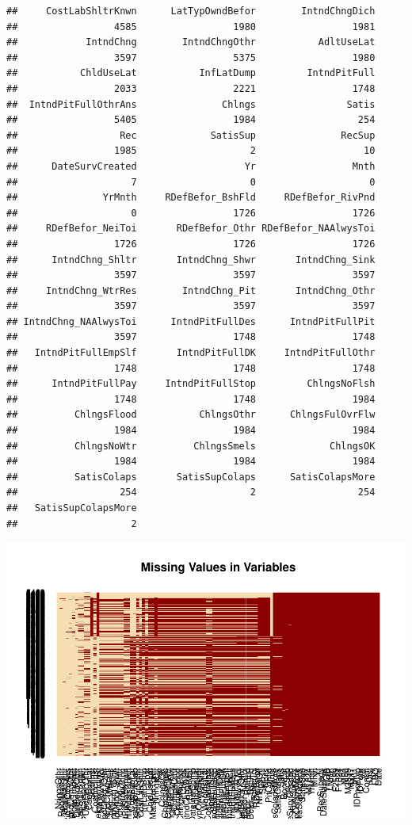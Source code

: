 \documentclass[11pt,]{article}
\begin{document}
\begin{verbatim}
##     CostLabShltrKnwn      LatTypOwndBefor        IntndChngDich 
##                 4585                 1980                 1981 
##            IntndChng        IntndChngOthr           AdltUseLat 
##                 3597                 5375                 1980 
##           ChldUseLat           InfLatDump         IntndPitFull 
##                 2033                 2221                 1748 
##  IntndPitFullOthrAns               Chlngs                Satis 
##                 5405                 1984                  254 
##                  Rec             SatisSup               RecSup 
##                 1985                    2                   10 
##      DateSurvCreated                   Yr                 Mnth 
##                    7                    0                    0 
##               YrMnth     RDefBefor_BshFld     RDefBefor_RivPnd 
##                    0                 1726                 1726 
##     RDefBefor_NeiToi       RDefBefor_Othr RDefBefor_NAAlwysToi 
##                 1726                 1726                 1726 
##      IntndChng_Shltr       IntndChng_Shwr       IntndChng_Sink 
##                 3597                 3597                 3597 
##     IntndChng_WtrRes        IntndChng_Pit       IntndChng_Othr 
##                 3597                 3597                 3597 
## IntndChng_NAAlwysToi      IntndPitFullDes      IntndPitFullPit 
##                 3597                 1748                 1748 
##   IntndPitFullEmpSlf       IntndPitFullDK     IntndPitFullOthr 
##                 1748                 1748                 1748 
##      IntndPitFullPay     IntndPitFullStop         ChlngsNoFlsh 
##                 1748                 1748                 1984 
##          ChlngsFlood           ChlngsOthr      ChlngsFulOvrFlw 
##                 1984                 1984                 1984 
##          ChlngsNoWtr          ChlngsSmels             ChlngsOK 
##                 1984                 1984                 1984 
##          SatisColaps       SatisSupColaps      SatisColapsMore 
##                  254                    2                  254 
##   SatisSupColapsMore 
##                    2
\end{verbatim}

\includegraphics{describe_FSMintentions_regional_seasonal_iDE-Camb_surveysOct2017_files/figure-latex/summarize-1.pdf}
\end{document}
